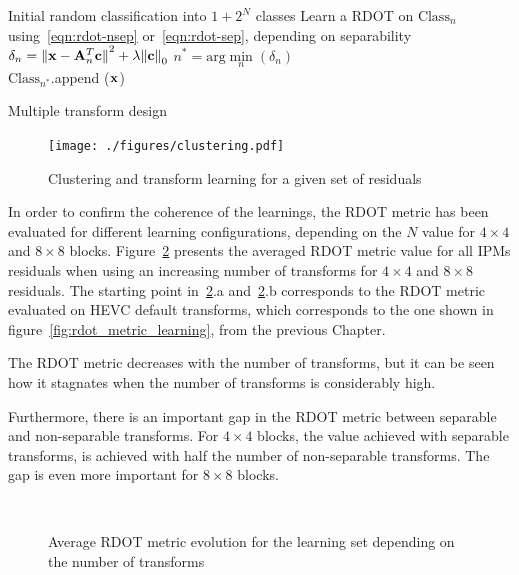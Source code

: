 \documentclass[11pt,a4paper,openright,twoside]{book}
\numberwithin{equation}{section} %
\numberwithin{figure}{section} %
\numberwithin{table}{section} %
\begin{document}
\begin{algorithm}
	\BlankLine%
	Initial random classification into $1+2^N$ classes
	\BlankLine%
	{
			{
				Learn a \ac{RDOT} on $\text{Class}_n$
				using~\eqref{eqn:rdot-nsep} or~\eqref{eqn:rdot-sep}, depending
				on separability
			}
			{
				{
					$\delta_n =
					{\Vert \mathbf{x} - \mathbf{A}^T_n\mathbf{c}\Vert}^2 + \lambda{\Vert\mathbf{c}\Vert}_0$
				}
				$\displaystyle n^* = \text{arg}\min\limits_n(\delta_n)$\\
				$\text{Class}_{n^*}$.append ($\mathbf{x}$)
			}
	}
	\caption{Multiple transform design}
	\label{alg:clustering}
\end{algorithm}

\begin{figure}[tp]
	\centering
	\texttt{[image: ./figures/clustering.pdf]}
	\caption{Clustering and transform learning for a given set of residuals}
	\label{fig:clustering}
\end{figure}

In order to confirm the coherence of the learnings, the \ac{RDOT} metric has
been evaluated for different learning configurations, depending on the $N$
value for $4\times4$ and $8\times8$ blocks.
Figure~\ref{fig:mdtc_rdot_metric_ntransforms} presents the averaged \ac{RDOT}
metric value for all \acp{IPM} residuals when using an increasing number of
transforms for $4\times4$ and $8\times8$ residuals.
The starting point in~\ref{fig:mdtc_rdot_metric_ntransforms}.a
and~\ref{fig:mdtc_rdot_metric_ntransforms}.b corresponds to the \ac{RDOT} metric
evaluated on \ac{HEVC} default transforms, which corresponds to the one shown
in figure~\ref{fig:rdot_metric_learning}, from the previous Chapter.

The \ac{RDOT} metric decreases with the number of transforms, but it can be
seen how it stagnates when the number of transforms is considerably high.

Furthermore, there is an important gap in the \ac{RDOT} metric between
separable and non-separable transforms.
For $4\times4$ blocks, the value achieved with separable transforms, is
achieved with half the number of non-separable transforms.
The gap is even more important for $8\times8$ blocks.

\begin{figure}[tb]
	\centering
	\\
	\caption{Average \ac{RDOT} metric evolution for the learning set depending
	on the number of transforms}
	\label{fig:mdtc_rdot_metric_ntransforms}
\end{figure}
\end{document}
